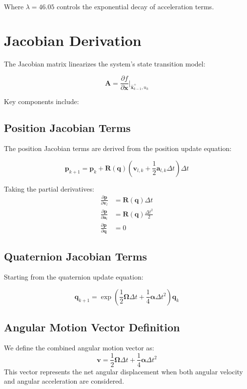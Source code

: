 \documentclass{article}
\begin{document}
	Where $\lambda = 46.05$ controls the exponential decay of acceleration terms.

\section{Jacobian Derivation}
The Jacobian matrix linearizes the system's state transition model:

\begin{equation}
	\mathbf{A} = \frac{\partial f}{\partial \mathbf{x}} \bigg|_{\hat{\mathbf{x}}_{k-1}^+, u_k}
\end{equation}

Key components include:

\subsection{Position Jacobian Terms}
The position Jacobian terms are derived from the position update equation:

\begin{equation}
	\mathbf{p}_{k+1} = \mathbf{p}_k + \mathbf{R}(\mathbf{q}) \left( \mathbf{v}_{l,k} + \frac{1}{2} \mathbf{a}_{l,k} \Delta t \right) \Delta t
\end{equation}

Taking the partial derivatives:
\begin{align*}
	\frac{\partial \mathbf{p}}{\partial \mathbf{v}_l} &= \mathbf{R}(\mathbf{q}) \Delta t \\
	\frac{\partial \mathbf{p}}{\partial \mathbf{a}_l} &= \mathbf{R}(\mathbf{q}) \frac{\Delta t^2}{2} \\
	\frac{\partial \mathbf{p}}{\partial \mathbf{q}} &= 0
\end{align*}

\subsection{Quaternion Jacobian Terms}
Starting from the quaternion update equation:

\begin{equation}
	\mathbf{q}_{k+1} = \exp\left(\frac{1}{2} \mathbf{\Omega} \Delta t + \frac{1}{4} \mathbf{\alpha} \Delta t^2\right) \mathbf{q}_k
\end{equation}

\subsection{Angular Motion Vector Definition}
We define the combined angular motion vector as:
\begin{equation}
	\mathbf{v} = \frac{1}{2} \mathbf{\Omega} \Delta t + \frac{1}{4} \mathbf{\alpha} \Delta t^2
\end{equation}
This vector represents the net angular displacement when both angular velocity and angular acceleration are considered.
\end{document}
